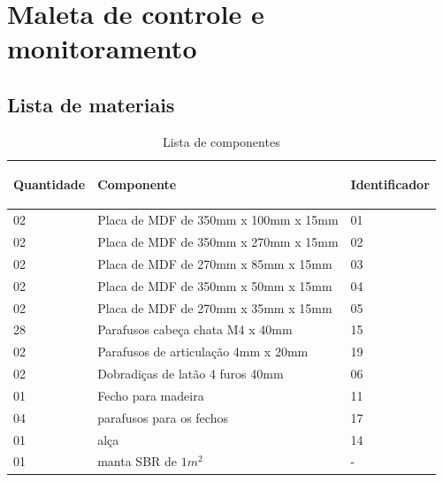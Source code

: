 \chapter{Maleta de controle e monitoramento}

\section{Lista de materiais}

\begin{table}[H]
\centering
\begin{tabular}{|m{2.0cm} |m{9.2cm}|m{2.0cm}|}
\hline
\begin{center}Quantidade\end{center} & \begin{center}Componente\end{center} &\begin{center} Identificador\end{center} \\\hline

    02 & Placa de MDF de 350mm x 100mm x 15mm & 01 \\\hline
    02 & Placa de MDF de 350mm x 270mm x 15mm & 02 \\\hline
    02 & Placa de MDF de 270mm x 85mm x 15mm & 03 \\\hline
    02 & Placa de MDF de 350mm x 50mm x 15mm & 04 \\\hline
    02 & Placa de MDF de 270mm x 35mm x 15mm & 05 \\\hline
    28 & Parafusos cabeça chata M4 x 40mm & 15 \\\hline
    02 & Parafusos de articulação 4mm x 20mm & 19 \\\hline
    02 & Dobradiças de latão 4 furos 40mm & 06 \\\hline
    01 & Fecho para madeira & 11 \\\hline
    04 & parafusos para os fechos & 17 \\\hline
    01 & alça & 14 \\\hline
    01 & manta SBR de $1 m^2$ & -  \\\hline

\end{tabular}
\label{table: tabelaComponentesMaletaControle}
\caption{Lista de componentes}
\end{table}

